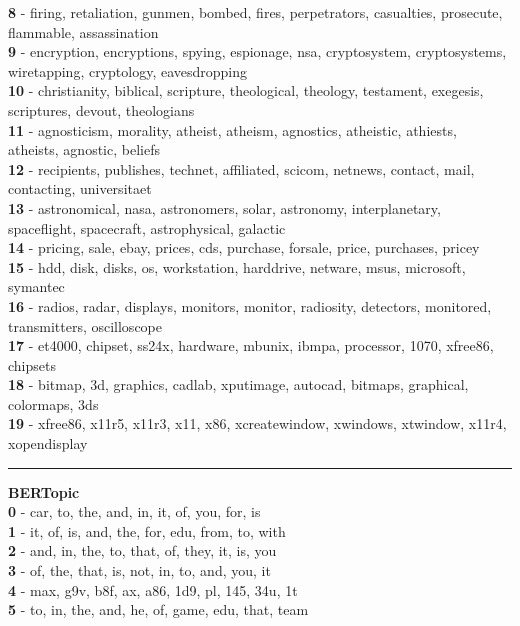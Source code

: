 \textbf{8} - firing, retaliation, gunmen, bombed, fires, perpetrators, casualties, prosecute, flammable, assassination\\
\textbf{9} - encryption, encryptions, spying, espionage, nsa, cryptosystem, cryptosystems, wiretapping, cryptology, eavesdropping\\
\textbf{10} - christianity, biblical, scripture, theological, theology, testament, exegesis, scriptures, devout, theologians\\
\textbf{11} - agnosticism, morality, atheist, atheism, agnostics, atheistic, athiests, atheists, agnostic, beliefs\\
\textbf{12} - recipients, publishes, technet, affiliated, scicom, netnews, contact, mail, contacting, universitaet\\
\textbf{13} - astronomical, nasa, astronomers, solar, astronomy, interplanetary, spaceflight, spacecraft, astrophysical, galactic\\
\textbf{14} - pricing, sale, ebay, prices, cds, purchase, forsale, price, purchases, pricey\\
\textbf{15} - hdd, disk, disks, os, workstation, harddrive, netware, msus, microsoft, symantec\\
\textbf{16} - radios, radar, displays, monitors, monitor, radiosity, detectors, monitored, transmitters, oscilloscope\\
\textbf{17} - et4000, chipset, ss24x, hardware, mbunix, ibmpa, processor, 1070, xfree86, chipsets\\
\textbf{18} - bitmap, 3d, graphics, cadlab, xputimage, autocad, bitmaps, graphical, colormaps, 3ds\\
\textbf{19} - xfree86, x11r5, x11r3, x11, x86, xcreatewindow, xwindows, xtwindow, x11r4, xopendisplay\\
\hrule\vspace{2mm}
\noindent
\textbf{BERTopic}\vspace{2mm}\\
\vspace{2mm}
\noindent
\textbf{0} - car, to, the, and, in, it, of, you, for, is\\
\textbf{1} - it, of, is, and, the, for, edu, from, to, with\\
\textbf{2} - and, in, the, to, that, of, they, it, is, you\\
\textbf{3} - of, the, that, is, not, in, to, and, you, it\\
\textbf{4} - max, g9v, b8f, ax, a86, 1d9, pl, 145, 34u, 1t\\
\textbf{5} - to, in, the, and, he, of, game, edu, that, team\\
